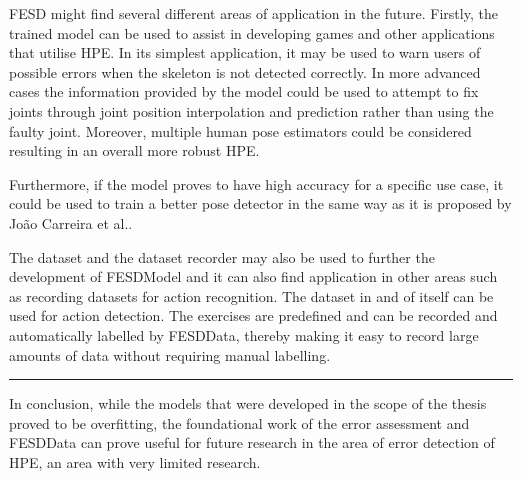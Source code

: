 FESD might find several different areas of application in the future. Firstly, the trained model can be used to assist in developing games and other applications that utilise HPE. In its simplest application, it may be used to warn users of possible errors when the skeleton is not detected correctly. In more advanced cases the information provided by the model could be used to attempt to fix joints through joint position interpolation and prediction rather than using the faulty joint. Moreover, multiple human pose estimators could be considered resulting in an overall more robust HPE.

Furthermore, if the model proves to have high accuracy for a specific use case, it could be used to train a better pose detector in the same way as it is proposed by Jo\~ao Carreira et al.\cite{IterativeErrorFeedback}.

The dataset and the dataset recorder may also be used to further the development of FESDModel and it can also find application in other areas such as recording datasets for action recognition. The dataset in and of itself can be used for action detection. The exercises are predefined and can be recorded and automatically labelled by FESDData, thereby making it easy to record large amounts of data without requiring manual labelling.

\noindent\rule[0.5pt]{\linewidth}{1pt}

In conclusion, while the models that were developed in the scope of the thesis proved to be overfitting, the foundational work of the error assessment and FESDData can prove useful for future research in the area of error detection of HPE, an area with very limited research.